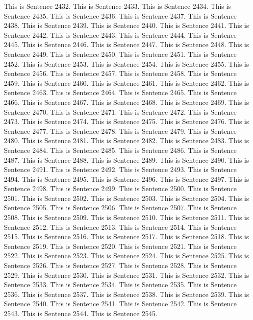 \documentclass{article}
\begin{document}
This is Sentence 2432.
This is Sentence 2433.
This is Sentence 2434.
This is Sentence 2435.
This is Sentence 2436.
This is Sentence 2437.
This is Sentence 2438.
This is Sentence 2439.
This is Sentence 2440.
This is Sentence 2441.
This is Sentence 2442.
This is Sentence 2443.
This is Sentence 2444.
This is Sentence 2445.
This is Sentence 2446.
This is Sentence 2447.
This is Sentence 2448.
This is Sentence 2449.
This is Sentence 2450.
This is Sentence 2451.
This is Sentence 2452.
This is Sentence 2453.
This is Sentence 2454.
This is Sentence 2455.
This is Sentence 2456.
This is Sentence 2457.
This is Sentence 2458.
This is Sentence 2459.
This is Sentence 2460.
This is Sentence 2461.
This is Sentence 2462.
This is Sentence 2463.
This is Sentence 2464.
This is Sentence 2465.
This is Sentence 2466.
This is Sentence 2467.
This is Sentence 2468.
This is Sentence 2469.
This is Sentence 2470.
This is Sentence 2471.
This is Sentence 2472.
This is Sentence 2473.
This is Sentence 2474.
This is Sentence 2475.
This is Sentence 2476.
This is Sentence 2477.
This is Sentence 2478.
This is Sentence 2479.
This is Sentence 2480.
This is Sentence 2481.
This is Sentence 2482.
This is Sentence 2483.
This is Sentence 2484.
This is Sentence 2485.
This is Sentence 2486.
This is Sentence 2487.
This is Sentence 2488.
This is Sentence 2489.
This is Sentence 2490.
This is Sentence 2491.
This is Sentence 2492.
This is Sentence 2493.
This is Sentence 2494.
This is Sentence 2495.
This is Sentence 2496.
This is Sentence 2497.
This is Sentence 2498.
This is Sentence 2499.
This is Sentence 2500.
This is Sentence 2501.
This is Sentence 2502.
This is Sentence 2503.
This is Sentence 2504.
This is Sentence 2505.
This is Sentence 2506.
This is Sentence 2507.
This is Sentence 2508.
This is Sentence 2509.
This is Sentence 2510.
This is Sentence 2511.
This is Sentence 2512.
This is Sentence 2513.
This is Sentence 2514.
This is Sentence 2515.
This is Sentence 2516.
This is Sentence 2517.
This is Sentence 2518.
This is Sentence 2519.
This is Sentence 2520.
This is Sentence 2521.
This is Sentence 2522.
This is Sentence 2523.
This is Sentence 2524.
This is Sentence 2525.
This is Sentence 2526.
This is Sentence 2527.
This is Sentence 2528.
This is Sentence 2529.
This is Sentence 2530.
This is Sentence 2531.
This is Sentence 2532.
This is Sentence 2533.
This is Sentence 2534.
This is Sentence 2535.
This is Sentence 2536.
This is Sentence 2537.
This is Sentence 2538.
This is Sentence 2539.
This is Sentence 2540.
This is Sentence 2541.
This is Sentence 2542.
This is Sentence 2543.
This is Sentence 2544.
This is Sentence 2545.
\end{document}
